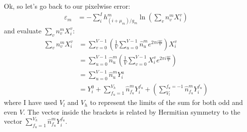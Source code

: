 \documentclass[11pt]{article}
\begin{document}
Ok, so let's go back to our pixelwise error:
\begin{align}
   \varepsilon_m &= - \sum_i^I h^m_{(i+\mu_m)/g_m} \ln\left(\sum_v n^m_v X^v_i\right)
\end{align}
and evaluate $\sum_v n^m_v X^v_i$:
\begin{align}
   \sum_v n^m_v X^v_i &= \sum_{v=0}^{V-1} \left( \frac{1}{V} \sum_{u=0}^{V-1} \hat{n}^m_u e^{2\pi i \frac{u v}{V}} \right) X^v_i \\
   &= \sum_{u=0}^{V-1} \hat{n}^m_u  \left( \frac{1}{V}  \sum_{v=0}^{V-1}  X^v_i e^{2\pi i \frac{u v}{V}}\right) \\
   &= \sum_{u=0}^{V-1} \hat{n}^m_u  Y^u_i \\
   &= Y^0_i + \sum_{f_u=1}^{V_h} \hat{n}^m_{f_u} Y^{f_u}_i + \left(\sum_{V_l}^{f_u=-1} \hat{n}^m_{f_u} Y^{f_u}_i\right) 
\end{align}
where I have used $V_l$ and $V_h$ to represent the limits of the sum for both odd and even $V$. The vector inside the brackets is related by Hermitian symmetry to the vector $\sum_{f_u=1}^{V_h} \hat{n}^m_{f_u} Y^{f_u}_i$.
\end{document}
